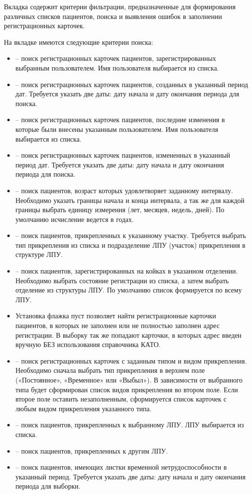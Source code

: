 Вкладка  содержит критерии фильтрации, предназначенные для формирования различных списков пациентов, поиска и выявления ошибок в заполнении регистрационных карточек.

На вкладке имеются следующие критерии поиска:
\begin{itemize}
 \item {} – поиск регистрационных карточек пациентов, зарегистрированных выбранным пользователем. Имя пользователя выбирается из списка.
 \item	{} – поиск регистрационных карточек пациентов, созданных в указанный период дат. Требуется указать две даты: дату начала и дату окончания периода для поиска.
 \item	{} – поиск регистрационных карточек пациентов, последние изменения в которые были внесены указанным пользователем. Имя пользователя выбирается из списка.
 \item	{} – поиск регистрационных карточек пациентов, измененных в указанный период дат. Требуется указать две даты: дату начала и дату окончания периода для поиска.
 \item	{} – поиск пациентов, возраст которых удовлетворяет заданному интервалу. Необходимо указать границы начала и конца интервала, а так же для каждой границы выбрать единицу измерения (лет, месяцев, недель, дней). По умолчанию исчисление ведется в годах.
 \item {} – поиск пациентов, прикрепленных к указанному участку. Требуется выбрать тип прикрепления из списка и подразделение ЛПУ (участок) прикрепления в структуре ЛПУ.
 \item	{} – поиск пациентов, зарегистрированных на койках в указанном отделении. Необходимо выбрать состояние регистрации из списка, а затем выбрать отделение из структуры ЛПУ. По умолчанию список формируется по всему ЛПУ.
 \item	Установка флажка  пуст позволяет найти регистрационные карточки пациентов, в которых не заполнен или не полностью заполнен адрес регистрации. В выборку так же попадают карточки, в которых адрес введен вручную БЕЗ использования справочника КАТО.
 \item {} – поиск регистрационных карточек с заданным типом и видом прикрепления. Необходимо сначала выбрать тип прикрепления в верхнем поле («Постоянное», «Временное» или «Выбыл»). В зависимости от выбранного типа будет сформирован список видов прикрепления во втором поле. Если второе поле оставить незаполненным, сформируется список карточек с любым видом прикрепления указанного типа.
 \item	{} – поиск пациентов, прикрепленных к выбранному ЛПУ. ЛПУ выбирается из списка.
 \item {} – поиск пациентов, прикрепленных к другим ЛПУ.
 \item	{} – поиск пациентов, имеющих листки временной нетрудоспособности в указанный период. Требуется указать две даты: дату начала и дату окончания периода для выборки.
\end{itemize}

